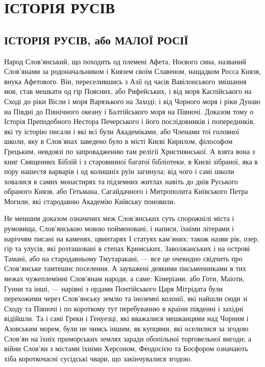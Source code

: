  
 
 
 
 

\chapter{ІСТОРІЯ РУСІВ}




\section{ІСТОРІЯ РУСІВ, або МАЛОЇ РОСІЇ}

Народ Слов'янський, що походить од племені Афета, Ноєвого сина, названий
Слов'янами за родоначальником і Князем своїм Славеном, нащадком Росса Князя,
внука Афетового. Він, переселившись з Азії од часів Вавілонського змішання мов,
став мешкати од гір Поясних, або Рифейських, і від моря Каспійського на Сході
до ріки Вісли і моря Варязького на Заході; і від Чорного моря і ріки Дунаю на
Півдні до Північного океану і Балтійського моря на Півночі. Доказом тому о
Історія Преподобного Нестора Печерського і його послідовників і попередників,
які ту історію писали і які всі були Академіками, або Членами тої головної
школи, яку в Слов'янах заведено було в місті Києві Кирилом, філософом Грецьким,
невдовзі по запровадженню там релігії Християнської. А взята вона з книг
Священних Біблій і з старовинної багатої бібліотеки, в Києві зібраної, яка в
пору нашестя варварів і од колишніх руїн загинула; від чого і самі школи
ховалися в самих монастирях та підземних житлах навіть до днів Руського
обраного Князя, або Гетьмана, Сагайдачного і Митрополита Київського Петра
Могили, які стародавню Академію Київську поновили.

Не меншим доказом означених меж Слов'янських суть спорожнілі міста і румовища,
Слов'янською мовою пойменовані, і написи, їхніми літерами і наріччям писані на
каменях, цвинтарях І статуях кам'яних; також назви рік, озер, гір та улусів,
які розташовані в степах Кримських, Заволжанських і на острові Тамані, або на
стародавньому Тмутаракані, — все це очевидно свідчить про Слов'янське тамтешнє
поселення. А зауважені деякими письменниками в тих межах чужеплемінні Слов'янам
народи, а саме: Кімеріани, або Готи, Маіоти, Гунни та інші, — нарівні з ордами
Понтійського Царя Мітрідата були перехожими через Слов'янську землю та іноземні
колонії, які найшли сюди зі Сходу та Півночі і по короткому тут перебуванню в
країни південні і західні відійшли. Та і самі Греки і Генуезці, які вважалися
мешканцями над Чорним і Азовським морем, були не чимсь іншим, як купцями, які
оселилися за згодою Слов'ян на їхніх приморських землях заради обопільної
торговельної вигоди; а війни Слов'ян з містами їхніми Херсоном, Феодосією та
Босфором означають хіба короткочасні сусідські чвари, що закінчувалися згодою.

